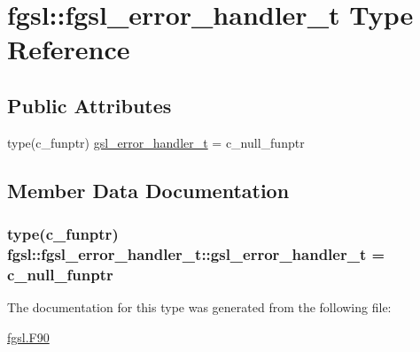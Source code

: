 \hypertarget{structfgsl_1_1fgsl__error__handler__t}{}\section{fgsl\+:\+:fgsl\+\_\+error\+\_\+handler\+\_\+t Type Reference}
\label{structfgsl_1_1fgsl__error__handler__t}
\subsection*{Public Attributes}
\begin{DoxyCompactItemize}
\item 
type(c\+\_\+funptr) \hyperlink{structfgsl_1_1fgsl__error__handler__t_a1686e995c1c7a589469b53b3a86a84a0}{gsl\+\_\+error\+\_\+handler\+\_\+t} = c\+\_\+null\+\_\+funptr
\end{DoxyCompactItemize}


\subsection{Member Data Documentation}
\hypertarget{structfgsl_1_1fgsl__error__handler__t_a1686e995c1c7a589469b53b3a86a84a0}{}
\subsubsection[{gsl\+\_\+error\+\_\+handler\+\_\+t}]{\setlength{\rightskip}{0pt plus 5cm}type(c\+\_\+funptr) fgsl\+::fgsl\+\_\+error\+\_\+handler\+\_\+t\+::gsl\+\_\+error\+\_\+handler\+\_\+t = c\+\_\+null\+\_\+funptr}\label{structfgsl_1_1fgsl__error__handler__t_a1686e995c1c7a589469b53b3a86a84a0}


The documentation for this type was generated from the following file\+:\begin{DoxyCompactItemize}
\item 
\hyperlink{fgsl_8F90}{fgsl.\+F90}\end{DoxyCompactItemize}
